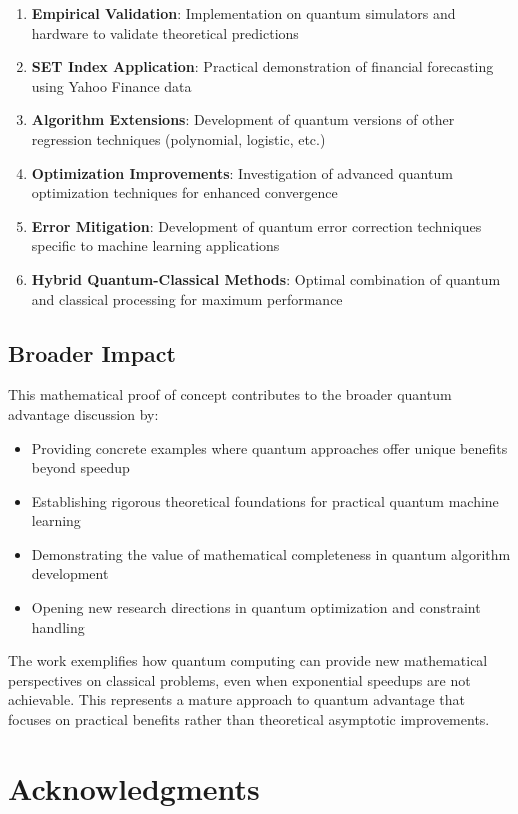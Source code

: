 \documentclass[11pt]{article}
\begin{document}
\begin{enumerate}
\item \textbf{Empirical Validation}: Implementation on quantum simulators and hardware to validate theoretical predictions
\item \textbf{SET Index Application}: Practical demonstration of financial forecasting using Yahoo Finance data
\item \textbf{Algorithm Extensions}: Development of quantum versions of other regression techniques (polynomial, logistic, etc.)
\item \textbf{Optimization Improvements}: Investigation of advanced quantum optimization techniques for enhanced convergence
\item \textbf{Error Mitigation}: Development of quantum error correction techniques specific to machine learning applications
\item \textbf{Hybrid Quantum-Classical Methods}: Optimal combination of quantum and classical processing for maximum performance
\end{enumerate}

\subsection{Broader Impact}

This mathematical proof of concept contributes to the broader quantum advantage discussion by:

\begin{itemize}
\item Providing concrete examples where quantum approaches offer unique benefits beyond speedup
\item Establishing rigorous theoretical foundations for practical quantum machine learning
\item Demonstrating the value of mathematical completeness in quantum algorithm development
\item Opening new research directions in quantum optimization and constraint handling
\end{itemize}

The work exemplifies how quantum computing can provide new mathematical perspectives on classical problems, even when exponential speedups are not achievable. This represents a mature approach to quantum advantage that focuses on practical benefits rather than theoretical asymptotic improvements.

\section*{Acknowledgments}
\end{document}
